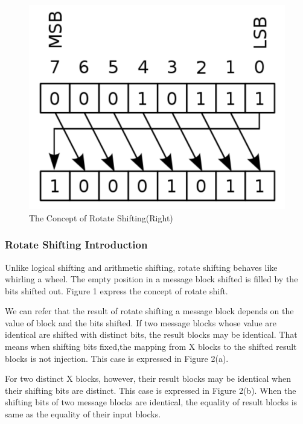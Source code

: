 \documentclass{article}
\begin{document}
\begin{figure}[htbp]
 \centering
 \includegraphics[scale=0.4]{./diagrams/rotate_right.pdf}
 \caption{The Concept of Rotate Shifting(Right)}
 \label{fig:1 }
\end{figure}

\subsubsection{Rotate Shifting Introduction} 
Unlike logical shifting and arithmetic shifting, rotate shifting
behaves like whirling a wheel. The empty position in a message block shifted is
filled by the bits shifted out. Figure 1 express the concept of rotate shift.

We can refer that the result of rotate shifting a message block depends on the
value of block and the bits shifted.  If two message blocks whose value are
identical are shifted with distinct bits, the result blocks may be
identical. That means when shifting bits fixed,the mapping from X blocks to the
shifted result blocks is not injection. This case is expressed in Figure 2(a).

For two distinct X blocks, however, their result blocks may be identical
when their shifting bits are distinct. This case is expressed in Figure 2(b).  
When the shifting bits of two message blocks are identical, the equality of result blocks
is same as the equality of their input blocks.				
\end{document}
